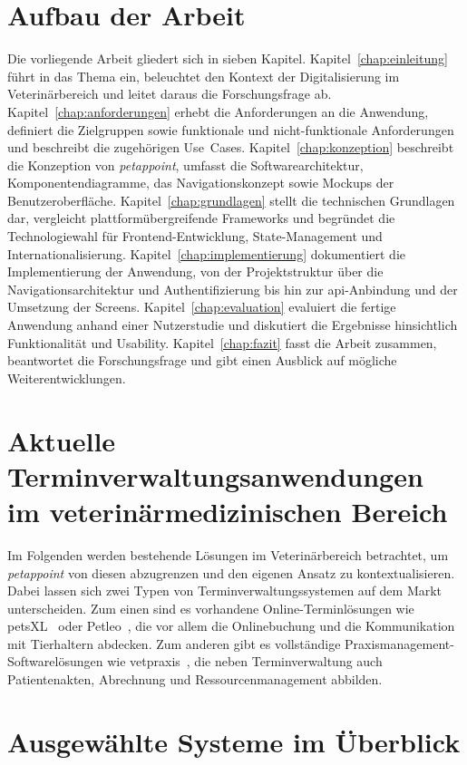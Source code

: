 \section{Aufbau der Arbeit}
Die vorliegende Arbeit gliedert sich in sieben Kapitel.
Kapitel~\ref{chap:einleitung} führt in das Thema ein, beleuchtet den Kontext der Digitalisierung im Veterinärbereich und leitet daraus die Forschungsfrage ab. 
Kapitel~\ref{chap:anforderungen} erhebt die Anforderungen an die Anwendung, definiert die Zielgruppen sowie funktionale und nicht-funktionale Anforderungen und beschreibt die zugehörigen Use~Cases.
Kapitel~\ref{chap:konzeption} beschreibt die Konzeption von \textit{petappoint}, umfasst die Softwarearchitektur, Komponentendiagramme, das Navigationskonzept sowie Mockups der Benutzeroberfläche.
Kapitel~\ref{chap:grundlagen} stellt die technischen Grundlagen dar, vergleicht plattformübergreifende Frameworks und begründet die Technologiewahl für Frontend-Entwicklung, State-Management und Internationalisierung.
Kapitel~\ref{chap:implementierung} dokumentiert die Implementierung der Anwendung, von der Projektstruktur über die Navigationsarchitektur und Authentifizierung bis hin zur \gls{api}-Anbindung und der Umsetzung der Screens.
Kapitel~\ref{chap:evaluation} evaluiert die fertige Anwendung anhand einer Nutzerstudie und diskutiert die Ergebnisse hinsichtlich Funktionalität und Usability.
Kapitel~\ref{chap:fazit} fasst die Arbeit zusammen, beantwortet die Forschungsfrage und gibt einen Ausblick auf mögliche Weiterentwicklungen.

\section{Aktuelle Terminverwaltungsanwendungen im veterinärmedizinischen Bereich}

Im Folgenden werden bestehende Lösungen im Veterinärbereich betrachtet, um \textit{petappoint} von diesen abzugrenzen und den eigenen Ansatz zu kontextualisieren. Dabei lassen sich zwei Typen von Terminverwaltungssystemen auf dem Markt unterscheiden. Zum einen sind es vorhandene Online-Terminlösungen wie petsXL~\cite{petsxl-info} oder
Petleo~\cite{petleo-info}, die vor allem die Onlinebuchung und die
Kommunikation mit Tierhaltern abdecken. Zum anderen gibt es vollständige Praxismanagement-Softwarelösungen wie vetpraxis~\cite{vetpraxis-info}, die neben Terminverwaltung auch Patientenakten, Abrechnung und Ressourcenmanagement abbilden.

\section{Ausgewählte Systeme im Überblick}

